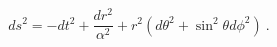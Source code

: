 \begin{equation}
\label{GM}
ds^2=-d t^2+\frac{dr^2}{\alpha^2}+r^2(d\theta^2+\sin^2\theta d\phi^2) \ .
\end{equation}

